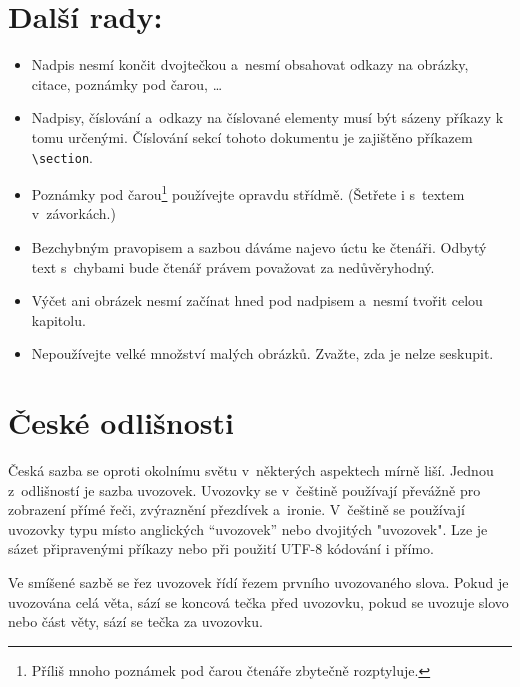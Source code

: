 \documentclass[twocolumn]{article}
\begin{document}
\section{Další rady:}\label{3}

\begin{itemize}
  \item 
Nadpis nesmí končit dvojtečkou a~nesmí obsahovat odkazy na obrázky, citace, poznámky pod čarou, \dots

 \item 
Nadpisy, číslování a~odkazy na číslované elementy musí být sázeny příkazy k tomu určenými.
Číslování sekcí tohoto dokumentu je zajištěno příkazem \verb|\section|.

 \item 
Poznámky pod čarou\footnote{Příliš mnoho poznámek pod čarou čtenáře zbytečně rozptyluje.} používejte opravdu střídmě.
(Šetřete i s~textem v~závorkách.)

 \item 
Bezchybným pravopisem a sazbou dáváme najevo úctu ke čtenáři.
Odbytý text s~chybami bude čtenář právem považovat za nedůvěryhodný.

 \item 
Výčet ani obrázek nesmí začínat hned pod nadpisem a~nesmí tvořit celou kapitolu.

 \item 
Nepoužívejte velké množství malých obrázků.
Zvažte, zda je nelze seskupit.
\end{itemize}


\section{České odlišnosti}

Česká sazba se oproti okolnímu světu v~některých aspektech mírně liší.
Jednou z~odlišností je sazba uvozovek.
Uvozovky se v~češtině používají převážně pro zobrazení přímé řeči, zvýraznění přezdívek a~ironie.
V~češtině se používají uvozovky typu  místo anglických “uvozovek” nebo dvojitých "uvozovek".
Lze je sázet připravenými příkazy nebo při použití UTF-8 kódování i přímo.

Ve smíšené sazbě se řez uvozovek řídí řezem prvního uvozovaného slova.
Pokud je uvozována celá věta, sází se koncová tečka před uvozovku, pokud se uvozuje slovo nebo část věty, sází se tečka za uvozovku.
\end{document}
